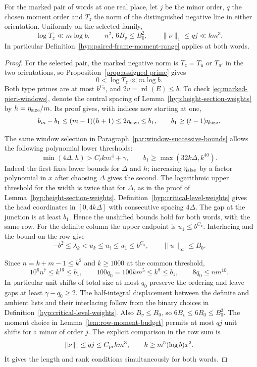 \begin{auxlemma}\label{lem:marked-paired-moment-range}
For the marked pair of words at one real place, let \(j\) be the minor order, \(q\) the chosen moment order and \(T_z\) the norm of the distinguished negative line in either orientation. Uniformly on the selected family,
\[
    \log T_z\ll m\log b,\qquad n^2,\,6B_v\le B_0^2,
    \qquad \|\nu\|_1\le qj\ll km^3 .
\]
In particular Definition~\ref{hyp:paired-frame-moment-range} applies at both words.
\end{auxlemma}
\begin{proof}
For the selected pair, the marked negative norm is \(T_z=T_u\) or
\(T_{u'}\) in the two orientations, so Proposition~\ref{prop:assigned-prime} gives
\[
    0<\log T_z\ll m\log b .
\]
Both type primes are at most \(b^{C_g}\), and
\(2v=\operatorname{rd}(E)\le b\). To check \eqref{eq:marked-pieri-windows}, denote the central spacing
of Lemma~\ref{hyp:height-section-weights} by \(h=\eta_{\rm size}/m\).
Its proof gives, with indices now starting at one,
\[
 b_m-b_1\le (m-1)(h+1)\le 2\eta_{\rm size}\le b_1 ,
 \qquad b_1\ge(t-1)\eta_{\rm size}.
\]

The same window selection in Paragraph~\ref{par:window-successive-bounds}
allows the following polynomial lower thresholds:
\[
 \min(4\Delta,h)> C_\ell k m^4+\gamma,\qquad
 b_1\ge\max(32k\Delta,k^{40}) .
\]
Indeed the first fixes lower bounds for \(\Delta\) and \(h\);
increasing \(\eta_{\rm size}\) by a factor polynomial in \(x\)
after choosing \(\Delta\) gives the second. The logarithmic
upper threshold for the width is twice that for \(\Delta\), as in
the proof of Lemma~\ref{hyp:height-section-weights}.
Definition~\ref{hyp:critical-level-weights} gives the head coordinates
in \([0,4k\Delta]\) with consecutive spacing \(4\Delta\).
The gap at the junction is at least \(b_1\). Hence the unshifted
bounds hold for both words, with the same row. For the definite column the upper endpoint is \(u_1\le b^{C_u}\).
Interlacing and the bound on the row give
\[
  -b^2\le\lambda_k<u_k\le u_i\le u_1\le b^{C_u},\qquad
  \|u\|_\infty\le B_0 .
\]

Since \(n=k+m-1\le k^2\) and \(k\ge1000\) at the common threshold,
\[
 10^6 n^7\le k^{16}\le b_1,\qquad
 100q_0=100km^5\le k^{8}\le b_1,\qquad
 8q_0\le nm^{10}.
\]
In particular unit shifts of total size at most \(q_0\) preserve
the ordering and leave gaps at least \(\gamma-q_0\ge2\).
The half-integral displacement between the definite and ambient
lists and their interlacing follow from the binary choices in
Definition~\ref{hyp:critical-level-weights}.
Also \(B_v\le B_0\), so \(6B_v\le6B_0\le B_0^2\).
The moment choice in
Lemma~\ref{lem:row-moment-budget} permits at most \(qj\) unit shifts
for a minor of order \(j\). The explicit comparison in the row sum is
\[
   \|\nu\|_1\le qj\le C_{\rm pr}km^3,\qquad
   k\ge m^5(\log b)x^2.
\]
It gives the length and rank conditions simultaneously for both words.
\end{proof}

